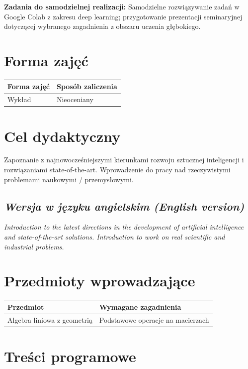 \documentclass[12pt, a4paper]{article}
\begin{document}
\vspace{4pt}
\noindent\textbf{Zadania do samodzielnej realizacji:} Samodzielne rozwiązywanie zadań w Google Colab z zakresu deep learning; przygotowanie prezentacji seminaryjnej dotyczącej wybranego zagadnienia z obszaru uczenia głębokiego.

\section{Forma zajęć}

\begin{tabular}{ll}
  \hline
  \textbf{Forma zajęć} & \textbf{Sposób zaliczenia} \\
  \hline
  Wykład & Nieoceniany \\
  \hline
\end{tabular}

\section{Cel dydaktyczny}

Zapoznanie z najnowocześniejszymi kierunkami rozwoju sztucznej inteligencji i rozwiązaniami state-of-the-art. Wprowadzenie do pracy nad rzeczywistymi problemami naukowymi / przemysłowymi.

\subsection*{\textit{Wersja w języku angielskim (English version)}}

\textit{Introduction to the latest directions in the development of artificial intelligence and state-of-the-art solutions. Introduction to work on real scientific and industrial problems.}


\section{Przedmioty wprowadzające}

\begin{tabularx}{\textwidth}{lX}
  \hline
  \textbf{Przedmiot} & \textbf{Wymagane zagadnienia} \\
  \hline
  Algebra liniowa z geometrią & Podstawowe operacje na macierzach \\
  \hline
\end{tabularx}

\section{Treści programowe}
\end{document}
